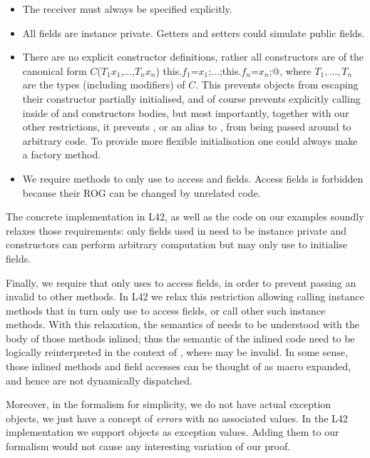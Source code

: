 \begin{itemize}
\item The \Q@this@ receiver must always be specified explicitly.
\item All fields are instance private. Getters and setters could simulate public fields.
\item There are no explicit constructor definitions, rather all constructors are of the canonical form
\Q@$C$($T_1 x_1$,$\ldots$,$T_n x_n$) {this.$f_1$=$x_1$;$\ldots$;this.$f_n$=$x_n$;}@,
 where $T_1, \ldots, T_n$ are the types (including modifiers) of $C$.
This prevents objects from escaping their constructor partially initialised, and of course prevents explicitly calling \Q@invariant@ inside of \Q@invariants@ and constructors bodies, but most importantly, together with our other restrictions, it prevents \Q@this@, or an alias to \Q@this@, from being passed around to arbitrary code.
To provide more flexible initialisation one could always make a factory method.
\item We require \Q@invariant@ methods to only use \Q@this@ to 
access \Q@imm@ and \Q@capsule@ fields.
Access \Q@mut@ fields is forbidden because their ROG can be changed by unrelated code.
\end{itemize}
The concrete implementation in L42, as well as the code on our examples
soundly relaxes those requirements:
only \Q@capsule@ fields used in \Q@invariant@ need to be instance private and
constructors can perform arbitrary computation but
may only use \Q@this@ to initialise fields.


Finally, we require that \Q@invariant@
only uses \Q@this@ to access fields,
in order to prevent passing an invalid \Q@this@ to other methods.
In L42 we relax this restriction allowing calling instance methods that in turn only use \Q@this@ to access fields, or call other such instance methods. With this relaxation, the semantics of \Q@invariant@ needs to be understood with the body of those methods inlined; thus the semantic of the inlined code need to be logically reinterpreted in the context of \Q@invariant@, where \Q@this@ may be invalid.
In some sense, those inlined methods and field accesses can be thought of as macro expanded, and hence are not dynamically dispatched. 



Moreover, in the formalism for simplicity, we do not have actual exception objects, we just have a concept of \emph{errors} with no associated values.
In the L42 implementation we support \Q@imm@ objects as exception values. Adding them to our formalism would not cause any interesting variation of our proof.


